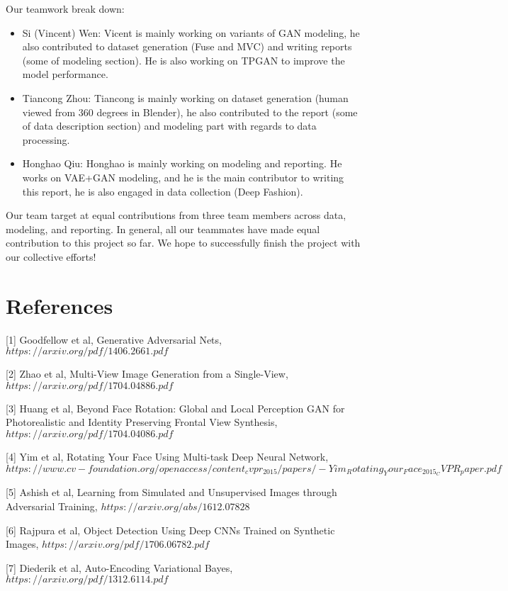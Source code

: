 \documentclass[10pt,conference]{IEEEtran}
\begin{document}
Our teamwork break down:
\begin{itemize}
\item Si (Vincent) Wen: Vicent is mainly working on variants of GAN modeling, he also contributed to dataset generation (Fuse and MVC) and writing reports (some of modeling section). He is also working on TPGAN to improve the model performance.
\item Tiancong Zhou: Tiancong is mainly working on dataset generation (human viewed from 360 degrees in Blender), he also contributed to the report (some of data description section) and modeling part with regards to data processing.
\item Honghao Qiu: Honghao is mainly working on modeling and reporting. He works on VAE+GAN modeling, and he is the main contributor to writing this report, he is also engaged in data collection (Deep Fashion).
\end{itemize}

Our team target at equal contributions from three team members across data, modeling, and reporting.  In general, all our teammates have made equal contribution to this project so far. We hope to successfully finish the project with our collective efforts!

\section{References}

[1] Goodfellow et al, Generative Adversarial Nets, $https://arxiv.org/pdf/1406.2661.pdf$ 

[2] Zhao et al, Multi-View Image Generation from a Single-View, $https://arxiv.org/pdf/1704.04886.pdf$

[3] Huang et al, Beyond Face Rotation: Global and Local Perception GAN for Photorealistic and Identity Preserving Frontal View Synthesis, $https://arxiv.org/pdf/1704.04086.pdf$ 

[4] Yim et al, Rotating Your Face Using Multi-task Deep Neural Network, $https://www.cv-foundation.org/openaccess/content_cvpr_2015/papers/-Yim_Rotating_Your_Face_2015_CVPR_paper.pdf$

[5] Ashish et al, Learning from Simulated and Unsupervised Images through Adversarial Training, $https://arxiv.org/abs/1612.07828$

[6] Rajpura et al, Object Detection Using Deep CNNs Trained on Synthetic Images, $https://arxiv.org/pdf/1706.06782.pdf$

[7] Diederik et al, Auto-Encoding Variational Bayes, $https://arxiv.org/pdf/1312.6114.pdf$
\end{document}
